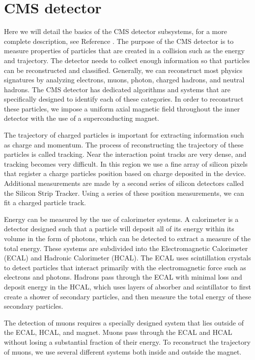 \section{CMS detector}
Here we will detail the basics of the CMS detector subsystems, for a more complete description, see Reference \cite{Bayatian:922757}.
The purpose of the CMS detector is to measure properties of particles that are created in a collision such as the energy and trajectory. 
The detector needs to collect enough information so that particles can be reconstructed and classified.  
Generally, we can reconstruct most physics signatures by analyzing electrons, muons, photon, charged hadrons, and neutral hadrons. 
The CMS detector has dedicated algorithms and systems that are specifically designed to identify each of these categories.  In order to reconstruct these particles, we impose a uniform axial magnetic field throughout the inner detector with the use of a superconducting magnet. 

The trajectory of charged particles is important for extracting information such as charge and momentum.  
The process of reconstructing the trajectory of these  particles is called tracking.  
Near the interaction point tracks are very dense, and tracking becomes very difficult.  
In this region we use a fine array of silicon pixels that register a charge particles position based on charge deposited in the device.  
Additional measurements are made by a second series of silicon detectors called the Silicon Strip Tracker. 
Using a series of these position measurements, we can fit a charged particle track.  

Energy can be measured by the use of calorimeter systems.  
A calorimeter is a detector designed such that a particle will deposit all of its energy within its volume in the form of photons, 
which can be detected to extract a measure of the total energy. 
These systems are subdivided into the Electromagnetic Calorimeter (ECAL) and Hadronic Calorimeter (HCAL).  
The ECAL uses scintillation crystals to detect particles that interact primarily with the electromagnetic force such as electrons and photons.  
Hadrons pass through the ECAL with minimal loss and deposit energy in the HCAL, which uses layers of absorber and scintillator to first 
create a shower of secondary particles, and then measure the total energy of these secondary particles.  

The detection of muons requires a specially designed system that lies outside of the ECAL, HCAL, and magnet.  
Muons pass through the ECAL and HCAL without losing a substantial fraction of their energy.  
To reconstruct the trajectory of muons, we use several different systems both inside and outside the magnet.


